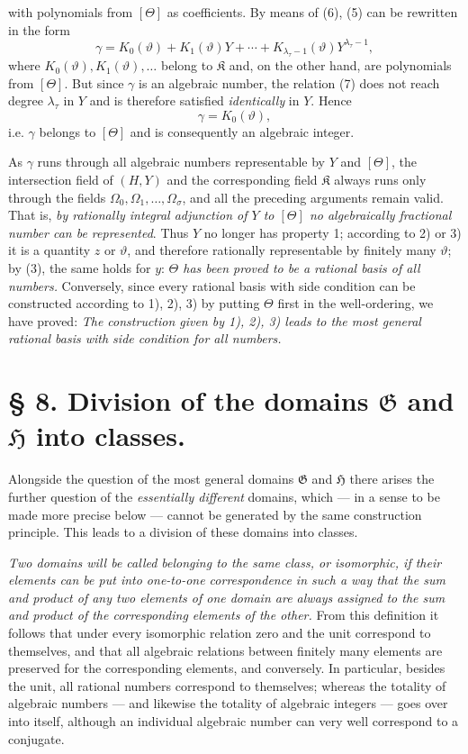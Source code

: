 \documentclass[11pt]{article}
\begin{document}
with polynomials from $[\Theta]$ as coefficients. By means of (6), (5) can be
rewritten in the form
\begin{equation}
\gamma=K_0(\vartheta)+K_1(\vartheta)Y+\cdots+
K_{\lambda_\tau-1}(\vartheta)Y^{\lambda_\tau-1},
\tag{7}
\end{equation}
where $K_0(\vartheta),K_1(\vartheta),\ldots$ belong to $\mathfrak K$ and, on
the other hand, are polynomials from $[\Theta]$. But since $\gamma$ is an
algebraic number, the relation (7) does not reach degree $\lambda_\tau$ in $Y$
and is therefore satisfied \emph{identically} in $Y$. Hence
\[
 \gamma=K_0(\vartheta),
\]
i.e. $\gamma$ belongs to $[\Theta]$ and is consequently an algebraic integer.

As $\gamma$ runs through all algebraic numbers representable by $Y$ and
$[\Theta]$, the intersection field of $(H,Y)$ and the corresponding field
$\mathfrak K$ always runs only through the fields
$\Omega_0,\Omega_1,\ldots,\Omega_\sigma$, and all the preceding arguments remain
valid. That is, \emph{by rationally integral adjunction of $Y$ to $[\Theta]$ no
algebraically fractional number can be represented}. Thus $Y$ no longer has
property 1; according to 2) or 3) it is a quantity $z$ or $\vartheta$, and
therefore rationally representable by finitely many $\vartheta$; by (3), the same
holds for $y$: \emph{$\Theta$ has been proved to be a rational basis of all
numbers.} Conversely, since every rational basis with side condition can be
constructed according to 1), 2), 3) by putting $\Theta$ first in the
well-ordering, we have proved: \emph{The construction given by 1), 2), 3) leads
to the most general rational basis with side condition for all numbers.}

\section*{§ 8. Division of the domains $\mathfrak G$ and $\mathfrak H$ into classes.}

Alongside the question of the most general domains $\mathfrak G$ and
$\mathfrak H$ there arises the further question of the \emph{essentially
different} domains, which --- in a sense to be made more precise below --- cannot
be generated by the same construction principle. This leads to a division of
these domains into classes.

\emph{Two domains will be called belonging to the same class, or isomorphic, if
their elements can be put into one-to-one correspondence in such a way that the
sum and product of any two elements of one domain are always assigned to the sum
and product of the corresponding elements of the other.} From this definition it
follows that under every isomorphic relation zero and the unit correspond to
themselves, and that all algebraic relations between finitely many elements are
preserved for the corresponding elements, and conversely. In particular, besides
the unit, all rational numbers correspond to themselves; whereas the totality of
algebraic numbers --- and likewise the totality of algebraic integers --- goes
over into itself, although an individual algebraic number can very well
correspond to a conjugate.
\end{document}
